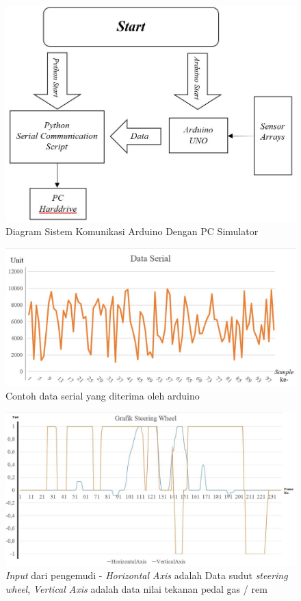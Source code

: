 \begin{figure} [!htb]
	\captionsetup{justification=centering}
	\includegraphics[scale=0.4]{img/arduino-python.JPG}
	\caption{Diagram Sistem Komunikasi Arduino Dengan PC Simulator}
	\label{fig:4.3}
\end{figure}

\begin{figure} [!htb]
	\captionsetup{justification=centering}
	\includegraphics[scale=0.4]{img/serial.JPG}
	\caption{Contoh data serial yang diterima oleh arduino}
	\label{fig:4.4}
\end{figure}

\begin{figure} [!htb]
	\captionsetup{justification=centering}
	\includegraphics[scale=0.3]{img/driverinput.JPG}
	\caption{\textit{Input} dari pengemudi - \textit{Horizontal Axis} adalah Data sudut \textit{steering wheel}, \textit{Vertical Axis} adalah data nilai tekanan pedal gas / rem}
	\label{fig:4.5}
\end{figure}

